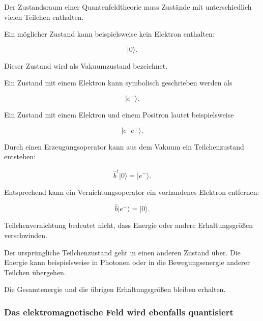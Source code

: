 Der Zustandsraum einer Quantenfeldtheorie muss Zustände mit
unterschiedlich vielen Teilchen enthalten.

Ein möglicher Zustand kann beispielsweise kein Elektron enthalten:

\begin{equation}
	\lvert 0\rangle.
\end{equation}

Dieser Zustand wird als Vakuumzustand%
 bezeichnet.

Ein Zustand mit einem Elektron kann symbolisch geschrieben werden als

\begin{equation}
	\lvert e^-\rangle.
\end{equation}

Ein Zustand mit einem Elektron und einem Positron lautet beispielsweise

\begin{equation}
	\lvert e^-e^+\rangle.
\end{equation}

Durch einen Erzeugungsoperator kann aus dem Vakuum ein Teilchenzustand
entstehen:

\begin{equation}
	\hat{b}^{\dagger}
	\lvert 0\rangle
	=
	\lvert e^-\rangle.
	\label{eq:erzeugung_elektron_vakuum}
\end{equation}

Entsprechend kann ein Vernichtungsoperator ein vorhandenes Elektron
entfernen:

\begin{equation}
	\hat{b}
	\lvert e^-\rangle
	=
	\lvert 0\rangle.
	\label{eq:vernichtung_elektron_vakuum}
\end{equation}

\begin{DidacticBox}
	\label{box:bedeutung_teilchenvernichtung}
	
	Teilchenvernichtung bedeutet nicht, dass Energie oder andere
	Erhaltungsgrößen verschwinden.
	
	Der ursprüngliche Teilchenzustand geht in einen anderen Zustand über.
	Die Energie kann beispielsweise in Photonen oder in die
	Bewegungsenergie anderer Teilchen übergehen.
	
	Die Gesamtenergie und die übrigen Erhaltungsgrößen bleiben erhalten.
\end{DidacticBox}

\subsubsection*{Das elektromagnetische Feld wird ebenfalls quantisiert}

